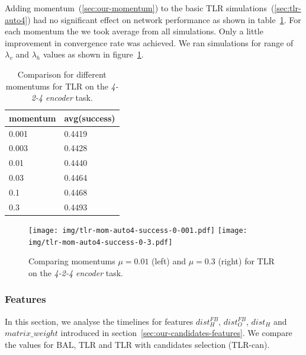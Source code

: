 Adding momentum~(\ref{sec:our-momentum}) to the basic TLR simulations~(\ref{sec:tlr-auto4}) had no significant effect on network performance as shown in table~\ref{tab:results-mom-auto4}. For each momentum the we took average from all simulations. Only a little improvement in convergence rate was achieved. We ran simulations for range of $\lambda_v$ and $\lambda_h$ values as shown in figure~\ref{fig:results-tlr-auto4-momentum}. 
\begin{table}[H] 
  \centering
  {\small
    \begin{tabular}{|l|l|}
    \hline
momentum & avg(success) \\
    \hline
0.001  & 0.4419 \\
    \hline
0.003  & 0.4428 \\
    \hline
0.01   & 0.4440 \\
    \hline
0.03   & 0.4464 \\
    \hline
0.1    & 0.4468 \\
    \hline
0.3    & 0.4493 \\
    \hline
    \end{tabular}
  }
  \caption{Comparison for different momentums for TLR on the \emph{4-2-4 encoder} task.} 
  \label{tab:results-mom-auto4}
\end{table}


\begin{figure}[H]
  \centering
  \texttt{[image: img/tlr-mom-auto4-success-0-001.pdf]}  
  \texttt{[image: img/tlr-mom-auto4-success-0-3.pdf]}  
   \caption{Comparing momentums $\mu=0.01$ (left) and $\mu=0.3$ (right) for TLR on the \emph{4-2-4 encoder} task.}
  \label{fig:results-tlr-auto4-momentum}
\end{figure}


\subsubsection{Features}
In this section, we analyse the timelines for features $dist_{H}^{FB}$, $dist_{O}^{FB}$, $dist_{H}$ and $matrix\_weight$ introduced in section~\ref{sec:our-candidates-features}. We compare the values for BAL, TLR and TLR with candidates selection (TLR-can). 

